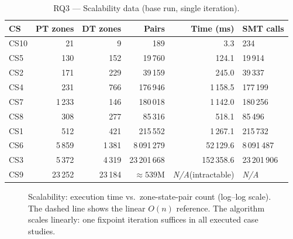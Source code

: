 \documentclass[10pt,a4paper]{article}
\newcommand{\NA}{\textcolor{notegray}{\textit{N/A}}}
\begin{document}
\begin{table}[htbp]
\centering
\caption{RQ3 — Scalability data (base run, single iteration).}
\label{tab:rq3_scale}
\small
\begin{tabular}{@{}lrrrrl@{}}
\toprule
\textbf{CS} & \textbf{PT zones} & \textbf{DT zones} & \textbf{Pairs} & \textbf{Time (ms)} & \textbf{SMT calls} \\
\midrule
CS10 &     21 &      9 &          189 &              3.3 &          234 \\
CS5  &    130 &    152 &       19\,760 &            124.1 &       19\,914 \\
CS2  &    171 &    229 &       39\,159 &            245.0 &       39\,337 \\
CS4  &    231 &    766 &      176\,946 &         1\,158.5 &      177\,199 \\
CS7  &  1\,233 &    146 &      180\,018 &         1\,142.0 &      180\,256 \\
CS8  &    308 &    277 &       85\,316 &            518.1 &       85\,496 \\
CS1  &    512 &    421 &      215\,552 &         1\,267.1 &      215\,732 \\
CS6  &  5\,859 &  1\,381 &    8\,091\,279 &        52\,129.6 &    8\,091\,487 \\
CS3  &  5\,372 &  4\,319 &   23\,201\,668 &       152\,358.6 &   23\,201\,906 \\
CS9  & 23\,252 & 23\,184 & ${\approx}539$M & \NA (intractable) & \NA \\
\bottomrule
\end{tabular}
\end{table}

\begin{figure}[htbp]
\centering
{}
\caption{Scalability: execution time vs.\ zone-state-pair count (log--log scale).
         The dashed line shows the linear $O(n)$ reference.
         The algorithm scales linearly: one fixpoint iteration suffices in all
         executed case studies.}
\label{fig:scalability}
\end{figure}
\end{document}

